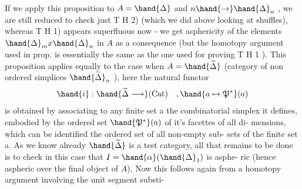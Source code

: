 If we apply this proposition to $A=\hand{\Delta}$ and $n \hand{\to} \hand{\Delta}_n$ , we are still
reduced to check just T H 2) (which we did above looking at shuffles),
whereas T H 1) appears superfluous now - we get asphericity of the
elements $\hand{\Delta}_m x \hand{\Delta}_n$ in $A\hat{}$ as a consequence (but the homotopy argument used in 
prop. is essentially the same as the one used for proving T H 1 ). This
proposition applies equally to the case when $A = \hand{\widetilde{\Delta}}$ (category of non ordered
simplices $\hand{\widetilde{\Delta}}_n$ ), here the natural functor
\[ \hand{i} : \hand{\widetilde{\Delta} \longrightarrow} \text{(Cat)} \quad , \hand{a \mapsto \mathfrak{P}^*}(a) \]
is obtained by associating to any finite set a the combinatorial simplex
it defines, embodied by the ordered set $\hand{\mathfrak{P}^*}(a)$ of it's facettes of all di-%
mensions, which can be identified  the ordered set of all non-empty sub-%
sets of the finite set a. As we know already $\hand{\widetilde{\Delta}}$ is a test category, all
that remains to be done is to check in this case that $I = \hand{\alpha}(\hand{\Delta}_1)$ is asphe-%
ric (hence aspheric over the final object of $A\hat{}$), Now this follows 
 again from a homotopy argument involving the unit segment substi-%
